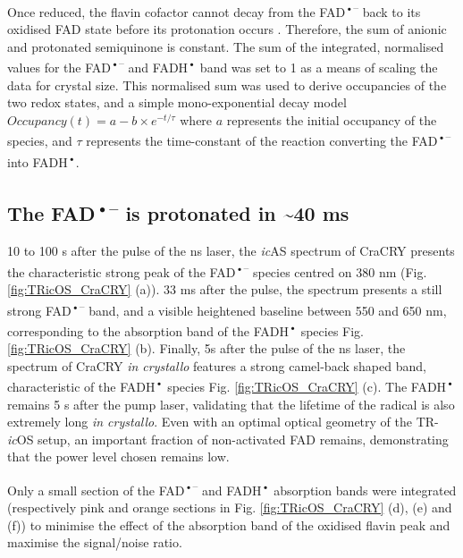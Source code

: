 Once reduced, the flavin cofactor cannot decay from the FAD\textsuperscript{•–} back to its oxidised FAD state before its protonation occurs \parencite{lacombatUltrafastOxidationTyrosine2019}. Therefore, the sum of anionic and protonated semiquinone is constant. The sum of the integrated, normalised values for the FAD\textsuperscript{•–} and FADH\textsuperscript{•} band was set to 1 as a means of scaling the data for crystal size. This normalised sum was used to derive occupancies of the two redox states, and a simple mono-exponential decay model \(Occupancy(t) = a - b\times e^{-t/\tau}\) where \(a\) represents the initial occupancy of the species, and \(\tau\) represents the time-constant of the reaction converting the FAD\textsuperscript{•–} into FADH\textsuperscript{•}. 

\subsection{The FAD\textsuperscript{•–} is protonated in \textasciitilde 40 ms}

10 to 100 \textmu s after the pulse of the ns laser, the \textit{ic}AS spectrum of CraCRY presents the characteristic strong peak of the FAD\textsuperscript{•–} species centred on 380 nm (Fig. \ref{fig:TRicOS_CraCRY} (a)). 33 ms after the pulse, the spectrum presents a still strong FAD\textsuperscript{•–} band, and a visible heightened baseline between 550 and 650 nm, corresponding to the absorption band of the FADH\textsuperscript{•} species Fig. \ref{fig:TRicOS_CraCRY} (b). Finally, 5s after the pulse of the ns laser, the spectrum of CraCRY \textit{in crystallo} features a strong camel-back shaped band, characteristic of the FADH\textsuperscript{•} species Fig. \ref{fig:TRicOS_CraCRY} (c). The FADH\textsuperscript{•} remains 5 s after the pump laser, validating that the lifetime of the radical is also extremely long \textit{in crystallo}. Even with an optimal optical geometry of the TR-\textit{ic}OS setup, an important fraction of non-activated FAD remains, demonstrating that the power level chosen remains low. 

Only a small section of the FAD\textsuperscript{•–} and FADH\textsuperscript{•} absorption bands were integrated (respectively pink and orange sections in Fig. \ref{fig:TRicOS_CraCRY} (d), (e) and (f)) to minimise the effect of the absorption band of the oxidised flavin peak and maximise the signal/noise ratio. 

